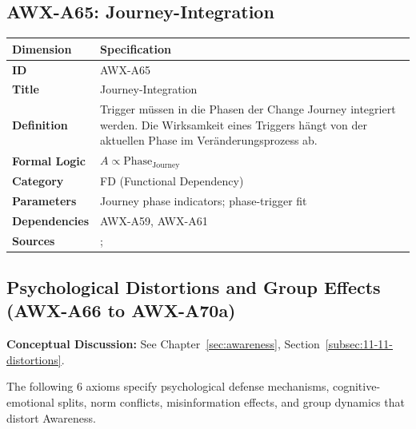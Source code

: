 
\subsection{AWX-A65: Journey-Integration}

\begin{table}[htbp]
\small
\begin{tabular}{p{3cm}p{11cm}}
\toprule
\textbf{Dimension} & \textbf{Specification} \\
\midrule
\textbf{ID} & AWX-A65 \\
\textbf{Title} & Journey-Integration \\
\textbf{Definition} & Trigger müssen in die Phasen der Change Journey integriert werden. Die Wirksamkeit eines Triggers hängt von der aktuellen Phase im Veränderungsprozess ab. \\
\textbf{Formal Logic} & $A \propto \text{Phase}_{\text{Journey}}$ \\
\textbf{Category} & FD (Functional Dependency) \\
\textbf{Parameters} & Journey phase indicators; phase-trigger fit \\
\textbf{Dependencies} & AWX-A59, AWX-A61 \\
\textbf{Sources} & \citet{PAP-prochaska1992stages}; \citet{kotter1995leading} \\
\bottomrule
\end{tabular}
\end{table}




\subsection{Psychological Distortions and Group Effects (AWX-A66 to AWX-A70a)}

\begin{cross-reference}
\textbf{Conceptual Discussion:} See Chapter~\ref{sec:awareness}, Section~\ref{subsec:11-11-distortions}.
\end{cross-reference}
The following 6 axioms specify psychological defense mechanisms, cognitive-emotional splits, norm conflicts, misinformation effects, and group dynamics that distort Awareness.

